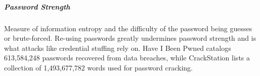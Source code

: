 \subparagraph{Password Strength}
Measure of information entropy and the difficulty of the password being guesses or brute-forced.
Re-using passwords greatly undermines password strength and is what attacks like credential stuffing rely on.
Have I Been Pwned \cite{hunt2021have} catalogs 613,584,248 passwords recovered from data breaches, while CrackStation \cite{hornby2019password} lists a collection of 1,493,677,782 words used for password cracking.